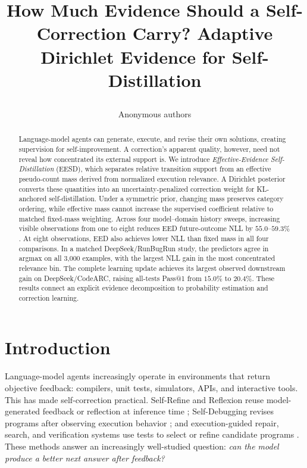 \documentclass{article}
\title{\raggedright How Much Evidence Should a Self-Correction Carry? Adaptive Dirichlet Evidence for Self-Distillation}
\author{Anonymous authors}
\date{}
\newcommand{\method}{\textsc{EESD}\xspace}
\begin{document}
\maketitle



\begin{abstract}
Language-model agents can generate, execute, and revise their own solutions, creating supervision for self-improvement. A correction's apparent quality, however, need not reveal how concentrated its external support is. We introduce \emph{Effective-Evidence Self-Distillation} (\method), which separates relative transition support from an effective pseudo-count mass derived from normalized execution relevance. A Dirichlet posterior converts these quantities into an uncertainty-penalized correction weight for KL-anchored self-distillation. Under a symmetric prior, changing mass preserves category ordering, while effective mass cannot increase the supervised coefficient relative to matched fixed-mass weighting. Across four model--domain history sweeps, increasing visible observations from one to eight reduces EED future-outcome NLL by $55.0$--$59.3\%$. At eight observations, EED also achieves lower NLL than fixed mass in all four comparisons. In a matched DeepSeek/RunBugRun study, the predictors agree in argmax on all 3,000 examples, with the largest NLL gain in the most concentrated relevance bin. The complete learning update achieves its largest observed downstream gain on DeepSeek/CodeARC, raising all-tests Pass@1 from $15.0\%$ to $20.4\%$. These results connect an explicit evidence decomposition to probability estimation and correction learning.
\end{abstract}





\section{Introduction}

Language-model agents increasingly operate in environments that return objective feedback: compilers, unit tests, simulators, APIs, and interactive tools. This has made self-correction practical. Self-Refine and Reflexion reuse model-generated feedback or reflection at inference time \citep{madaan2023selfrefine,shinn2023reflexion}; Self-Debugging revises programs after observing execution behavior \citep{chen2024selfdebug}; and execution-guided repair, search, and verification systems use tests to select or refine candidate programs \citep{ni2023lever,tang2024rex,li2025codeprm,li2025sstar,tao2026execcritic}. These methods answer an increasingly well-studied question: \emph{can the model produce a better next answer after feedback?}
\end{document}
